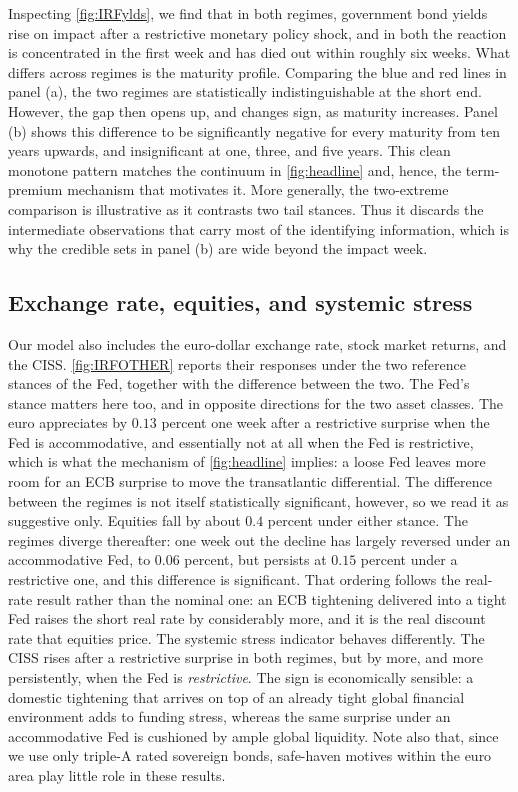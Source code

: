 Inspecting \autoref{fig:IRFylds}, we find that in both regimes, government bond yields rise on impact after a restrictive monetary policy shock, and in both the reaction is concentrated in the first week and has died out within roughly six weeks. What differs across regimes is the maturity profile. Comparing the blue and red lines in panel (a), the two regimes are statistically indistinguishable at the short end. However, the gap then opens up, and changes sign, as maturity increases. Panel (b) shows this difference to be significantly negative for every maturity from ten years upwards, and insignificant at one, three, and five years. This clean monotone pattern matches the continuum in \autoref{fig:headline} and, hence, the term-premium mechanism that motivates it.  More generally, the two-extreme comparison is illustrative as it contrasts two tail stances. Thus it discards the intermediate observations that carry most of the identifying information, which is why the credible sets in panel (b) are wide beyond the impact week. 



\subsection{Exchange rate, equities, and systemic stress}

Our model also includes the euro-dollar exchange rate, stock market returns, and the CISS. \autoref{fig:IRFOTHER} reports their responses under the two reference stances of the Fed, together with the difference between the two. The Fed's stance matters here too, and in opposite directions for the two asset classes. The euro appreciates by $0.13$ percent one week after a restrictive surprise when the Fed is accommodative, and essentially not at all when the Fed is restrictive, which is what the mechanism of \autoref{fig:headline} implies: a loose Fed leaves more room for an ECB surprise to move the transatlantic differential. The difference between the regimes is not itself statistically significant, however, so we read it as suggestive only. Equities fall by about $0.4$ percent under either stance. The regimes diverge thereafter: one week out the decline has largely reversed under an accommodative Fed, to $0.06$ percent, but persists at $0.15$ percent under a restrictive one, and this difference is significant. That ordering follows the real-rate result rather than the nominal one: an ECB tightening delivered into a tight Fed raises the short real rate by considerably more, and it is the real discount rate that equities price. The systemic stress indicator behaves differently. The CISS rises after a restrictive surprise in both regimes, but by more, and more persistently, when the Fed is \textit{restrictive}. The sign is economically sensible: a domestic tightening that arrives on top of an already tight global financial environment adds to funding stress, whereas the same surprise under an accommodative Fed is cushioned by ample global liquidity. Note also that, since we use only triple-A rated sovereign bonds, safe-haven motives within the euro area play little role in these results.

